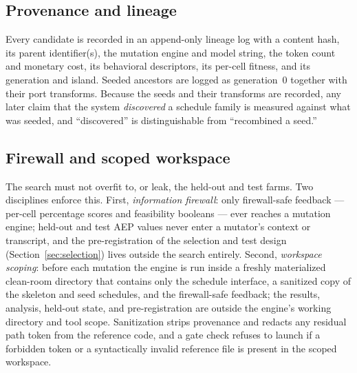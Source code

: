 \documentclass[11pt]{article}
\begin{document}
\subsection{Provenance and lineage}
\label{sec:provenance}
Every candidate is recorded in an append-only lineage log with a content hash, its
parent identifier(s), the mutation engine and model string, the token count and
monetary cost, its behavioral descriptors, its per-cell fitness, and its generation
and island. Seeded ancestors are logged as generation~0 together with their port
transforms. Because the seeds and their transforms are recorded, any later claim that
the system \emph{discovered} a schedule family is measured against what was seeded, and
``discovered'' is distinguishable from ``recombined a seed.''

\subsection{Firewall and scoped workspace}
\label{sec:firewall}
The search must not overfit to, or leak, the held-out and test farms. Two disciplines
enforce this. First, \emph{information firewall}: only firewall-safe feedback ---
per-cell percentage scores and feasibility booleans --- ever reaches a mutation
engine; held-out and test AEP values never enter a mutator's context or transcript,
and the pre-registration of the selection and test design (Section~\ref{sec:selection})
lives outside the search entirely. Second, \emph{workspace scoping}: before each
mutation the engine is run inside a freshly materialized clean-room directory that
contains only the schedule interface, a sanitized copy of the skeleton and seed
schedules, and the firewall-safe feedback; the results, analysis, held-out state, and
pre-registration are outside the engine's working directory and tool scope.
Sanitization strips provenance and redacts any residual path token from the reference
code, and a gate check refuses to launch if a forbidden token or a syntactically
invalid reference file is present in the scoped workspace.
\end{document}

